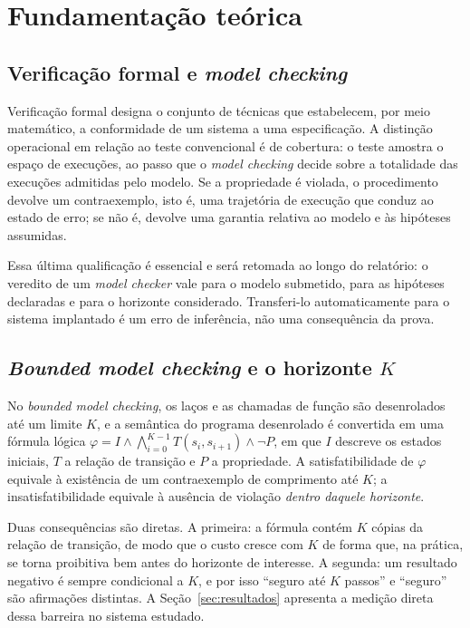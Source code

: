 \section{Fundamentação teórica}
\label{sec:fundamentacao}

\subsection{Verificação formal e \textit{model checking}}

Verificação formal designa o conjunto de técnicas que estabelecem, por meio matemático, a
conformidade de um sistema a uma especificação. A distinção operacional em relação ao teste
convencional é de cobertura: o teste amostra o espaço de execuções, ao passo que o
\textit{model checking} decide sobre a totalidade das execuções admitidas pelo modelo. Se a
propriedade é violada, o procedimento devolve um contraexemplo, isto é, uma trajetória de
execução que conduz ao estado de erro; se não é, devolve uma garantia relativa ao modelo e
às hipóteses assumidas.

Essa última qualificação é essencial e será retomada ao longo do relatório: o veredito de um
\textit{model checker} vale para o modelo submetido, para as hipóteses declaradas e para o
horizonte considerado. Transferi-lo automaticamente para o sistema implantado é um erro de
inferência, não uma consequência da prova.

\subsection{\textit{Bounded model checking} e o horizonte $K$}

No \textit{bounded model checking}, os laços e as chamadas de função são desenrolados até um
limite $K$, e a semântica do programa desenrolado é convertida em uma fórmula lógica
$\varphi = I \wedge \bigwedge_{i=0}^{K-1} T(s_i, s_{i+1}) \wedge \neg P$, em que $I$ descreve
os estados iniciais, $T$ a relação de transição e $P$ a propriedade. A satisfatibilidade de
$\varphi$ equivale à existência de um contraexemplo de comprimento até $K$; a
insatisfatibilidade equivale à ausência de violação \emph{dentro daquele horizonte}.

Duas consequências são diretas. A primeira: a fórmula contém $K$ cópias da relação de
transição, de modo que o custo cresce com $K$ de forma que, na prática, se torna proibitiva
bem antes do horizonte de interesse. A segunda: um resultado negativo é sempre condicional a
$K$, e por isso ``seguro até $K$ passos'' e ``seguro'' são afirmações distintas. A
Seção~\ref{sec:resultados} apresenta a medição direta dessa barreira no sistema estudado.

